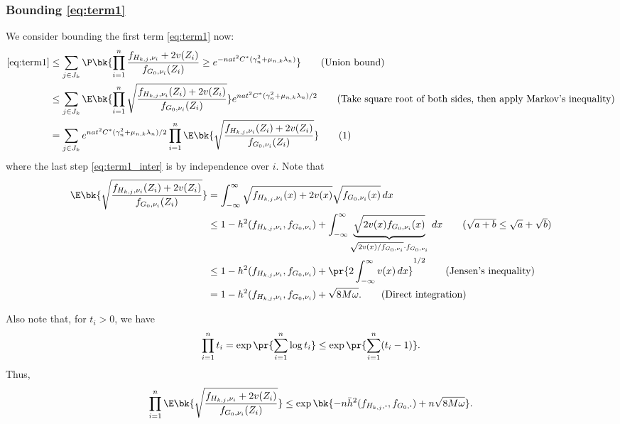 \documentclass[12pt, reqno]{amsart}
\newcommand\numberthis{\addtocounter{equation}{1}\tag{\theequation}}
\newcommand{\fs}[1]{f_{#1, \boldsymbol{\cdot}}}
\newcommand{\barh}{\bar h}
\numberwithin{equation}{section}
\begin{document}
\begin{refsection}
\begin{appendices}
\subsubsection{Bounding \eqref{eq:term1}} We consider bounding the first term
\eqref{eq:term1} now:
\begin{align*}
\eqref{eq:term1}
&\le \sum_{j\in J_k} \P\bk{\prod_{i=1}^n \frac{f_{H_{k,j}, \nu_i} + 2v(Z_i)}{f_{G_0,
\nu_i}
    (Z_i)} \ge e^{-n a t^2 C^* (\gamma_n^2 + \mu_{n,k} \lambda_n)}} \tag{Union bound}
\\
&\le \sum_{j\in J_k} \E\bk{
    \prod_{i=1}^n \sqrt{\frac{f_{H_{k,j}, \nu_i}(Z_i) + 2v(Z_i)}{f_{G_0, \nu_i}
    (Z_i)}}
    } e^{n a t^2 C^* (\gamma_n^2 + \mu_{n,k} \lambda_n)/2} \tag{Take square root
    of both sides, then apply Markov's inequality} \\
    &= \sum_{j\in J_k} e^{n a t^2 C^* (\gamma_n^2 + \mu_{n,k} \lambda_n)/2} \prod_
    {i=1}^n \E\bk{
    \sqrt{\frac{f_{H_{k,j}, \nu_i}(Z_i) + 2v(Z_i)}{f_{G_0, \nu_i}
    (Z_i)}}
    } \numberthis \label{eq:term1_inter}
\end{align*}
where the last step \eqref{eq:term1_inter} is by independence over $i$.
Note that \begin{align*}
\E\bk{
    \sqrt{\frac{f_{H_{k,j}, \nu_i}(Z_i) + 2v(Z_i)}{f_{G_0, \nu_i}
    (Z_i)}}
    } &= \int_{-\infty}^{\infty} \sqrt{ f_{H_{k,j}, \nu_i}(x) + 2v(x)} \sqrt{f_{G_0,
    \nu_i}
    (x)} \,dx
    \\
    &\le 1-h^2(f_{H_{k,j}, \nu_i}, f_{G_0, \nu_i}) + \int_{-\infty}^\infty \underbrace{
    \sqrt{2v (x)
        f_{G_0,\nu_i}(x)}}_{\sqrt{2v(x)/f_{G_0, \nu_i}} \cdot f_{G_0, \nu_i}} \,dx \tag{$
        \sqrt{a+b} \le \sqrt{a} + \sqrt{b}$}
    \\
    & \le  1-h^2(f_{H_{k,j}, \nu_i}, f_{G_0,\nu_i}) + \pr{2\int_{-\infty}^\infty v
    (x)\,dx}^{1/2} \tag{Jensen's inequality}
    \\
    &=  1-h^2(f_{H_{k,j}, \nu_i}, f_{G_0,\nu_i}) + \sqrt{8M   \omega}. 
    \tag{Direct integration}
\end{align*}

Also note that, for $t_i > 0$, we have \[
\prod_{i=1}^n t_i = \exp \pr{\sum_{i=1}^n \log t_i} \le \exp\pr {\sum_{i=1}^n (t_i - 1)}.
\]
Thus, \[
\prod_{i=1}^n \E
\bk{
    \sqrt{\frac{f_{H_{k,j}, \nu_i} + 2v(Z_i)}{f_{G_0, \nu_i}
    (Z_i)}}
    } \le \exp\bk{
    - n\barh^2(\fs{H_{k,j}}, \fs{G_0}) + n\sqrt{8M\omega}
    }.
\]


\end{appendices}
\end{refsection}
\end{document}

